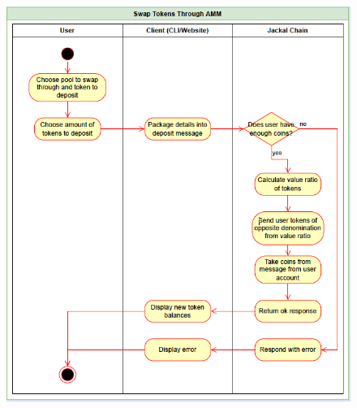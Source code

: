 \documentclass[a4paper]{article}
\begin{document}
\begin{figure}[!htbp]
\centering
\includegraphics[width=1\textwidth]{assets/lp5.png}
\caption{}
\end{figure}

\newpage
\end{document}
